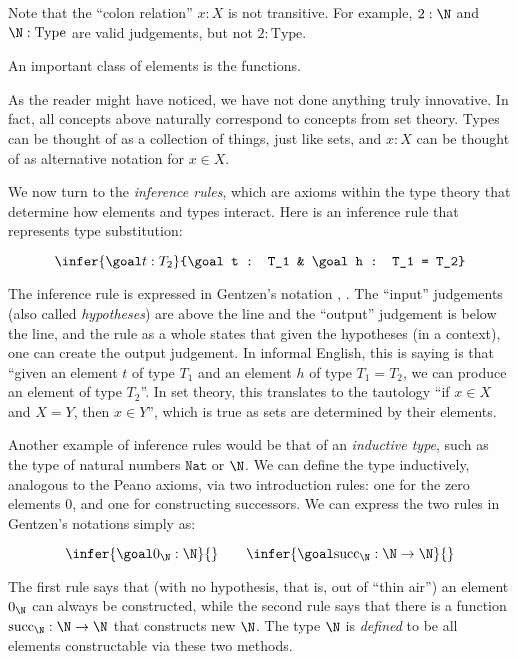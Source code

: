 Note that the ``colon relation'' \(x : X\) is not transitive. For example, \(2 : \N\) and \(\N : \mathrm{Type}\) are valid judgements, but not \(2 : \mathrm{Type}\).

An important class of elements is the functions. 

As the reader might have noticed, we have not done anything truly innovative. In fact, all concepts above naturally correspond to concepts from set theory. Types can be thought of as a collection of things, just like sets, and \(x : X\) can be thought of as alternative notation for \(x \in X\).

We now turn to the \textit{inference rules}, which are axioms within the type theory that determine how elements and types interact. Here is an inference rule that represents type substitution:

\[
  \infer{\goal t : T_2}{\goal t : T_1 & \goal h : T_1 = T_2}
\]

The inference rule is expressed in Gentzen's notation \cite{Gentzen1935a}, \cite{Gentzen1935b}. The ``input'' judgements (also called \textit{hypotheses}) are above the line and the ``output'' judgement is below the line, and the rule as a whole states that given the hypotheses (in a context), one can create the output judgement. In informal English, this is saying is that ``given an element \(t\) of type \(T_1\) and an element \(h\) of type \(T_1 = T_2\), we can produce an element of type \(T_2\)''. In set theory, this translates to the tautology ``if \(x \in X\) and \(X = Y\), then \(x \in Y\)'', which is true as sets are determined by their elements.

Another example of inference rules would be that of an \textit{inductive type}, such as the type of natural numbers \(\texttt{Nat}\) or \(\N\). We can define the type inductively, analogous to the Peano axioms, via two introduction rules: one for the zero elements \(0\), and one for constructing successors. We can express the two rules in Gentzen's notations simply as:

\[
  \infer{\goal 0_{\N} : \N}{} \qquad
  \infer{\goal \mathrm{succ}_{\N} : \N \to \N}{}
\]

The first rule says that (with no hypothesis, that is, out of ``thin air'') an element \(0_{\N}\) can always be constructed, while the second rule says that there is a function \(\mathrm{succ}_{\N} : \N \to \N\) that constructs new \(\N\). The type \(\N\) is \textit{defined} to be all elements constructable via these two methods.

